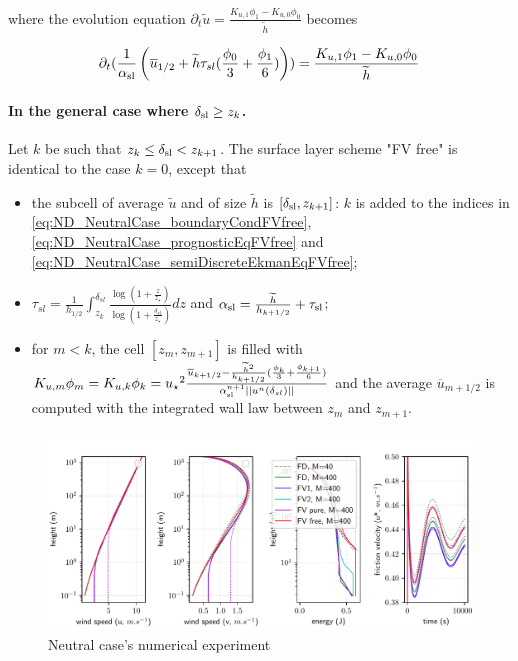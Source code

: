 where the evolution equation 
$ \partial_t \widetilde{u}
= \frac{K_{u, 1}\phi_1 - K_{u,0} \phi_0}{\widetilde{h}}$ becomes

\begin{equation}
	\label{eq:ND_NeutralCase_semiDiscreteEkmanEqFVfree}
	\partial_t (\frac{1}{\alpha_{\rm sl}}\left(\overline{u}_{1/2} + \widetilde{h}\tau_{sl}(\frac{\phi_0}{3} + \frac{\phi_1}{6})\right))
= \frac{K_{u, 1}\phi_1 - K_{u,0} \phi_0}{\widetilde{h}}
\end{equation}
\paragraph{In the general case where $\delta_{\rm sl} \geq z_k$.}
Let $k$ be such that $z_k \leq \delta_{\rm sl} < z_{k+1}$.
The surface layer scheme "FV free" is identical to the case $k=0$, except that
\begin{itemize}
	\item the subcell of average $\widetilde{u}$ and of size
		$\widetilde{h}$ is $[\delta_{\rm sl}, z_{k+1}]$:
		$k$ is added to the indices in 
		\eqref{eq:ND_NeutralCase_boundaryCondFVfree},
		\eqref{eq:ND_NeutralCase_prognosticEqFVfree} and
		\eqref{eq:ND_NeutralCase_semiDiscreteEkmanEqFVfree};
	\item $\tau_{sl} = \frac{1}{{h_{1/2}}}\int_{z_k}^{\delta_{sl}} \frac{\log(1+\frac{z}{z_{\star}})}{\log(1+\frac{\delta_{sl}}{z_\star})} dz$ and $\alpha_{\rm sl} = \frac{\widetilde{h}}{h_{k+1/2}} + \tau_{\rm sl}$;
	\item for $m < k$, the cell $[z_m, z_{m+1}]$ is filled with
		$K_{u,m} \phi_m = K_{u,k}\phi_k =
	{u_\star}^2 \frac{\overline{u}_{k+1/2} -
		\frac{\widetilde{h}^2}{h_{k+1/2}}
		(\frac{\phi_k}{3} + \frac{\phi_{k+1}}{6})}
		{\alpha_{\rm sl}^{n+1}||u^n(\delta_{sl})||}$
		and the average $\overline{u}_{m+1/2}$
		is computed with the integrated wall law
		between $z_m$ and $z_{m+1}$.
	
\end{itemize}
\begin{figure}
	\centering
	\includegraphics[scale=0.55]{images/consistency_comparison.pdf}
	\caption{Neutral case's numerical experiment}
	\label{fig:ND_NeutralCase_NumericalExp}
\end{figure}
